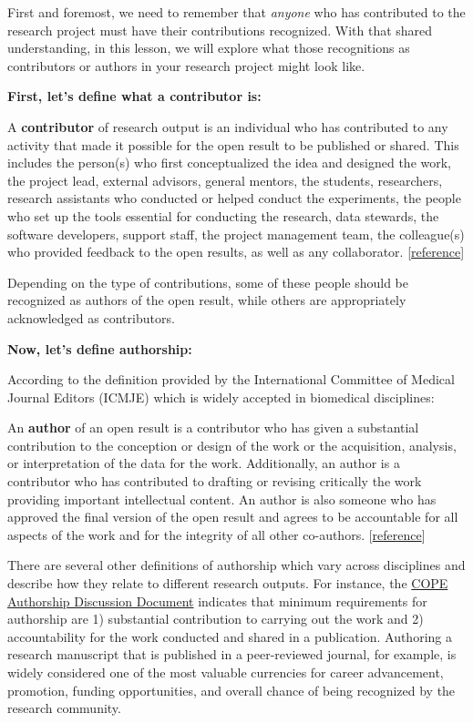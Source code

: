 \documentclass[
  letterpaper,
  DIV=11,
  numbers=noendperiod]{scrreport}
\begin{document}
First and foremost, we need to remember that \emph{anyone} who has
contributed to the research project must have their contributions
recognized. With that shared understanding, in this lesson, we will
explore what those recognitions as contributors or authors in your
research project might look like.

\textbf{First, let's define what a contributor is:}

A \textbf{contributor} of research output is an individual who has
contributed to any activity that made it possible for the open result to
be published or shared. This includes the person(s) who first
conceptualized the idea and designed the work, the project lead,
external advisors, general mentors, the students, researchers, research
assistants who conducted or helped conduct the experiments, the people
who set up the tools essential for conducting the research, data
stewards, the software developers, support staff, the project management
team, the colleague(s) who provided feedback to the open results, as
well as any collaborator.
{[}\href{https://the-turing-way.netlify.app/collaboration/shared-ownership/shared-ownership-projects.html}{reference}{]}

Depending on the type of contributions, some of these people should be
recognized as authors of the open result, while others are appropriately
acknowledged as contributors.

\textbf{Now, let's define authorship:}

According to the definition provided by the International Committee of
Medical Journal Editors (ICMJE) which is widely accepted in biomedical
disciplines:

An \textbf{author} of an open result is a contributor who has given a
substantial contribution to the conception or design of the work or the
acquisition, analysis, or interpretation of the data for the work.
Additionally, an author is a contributor who has contributed to drafting
or revising critically the work providing important intellectual
content. An author is also someone who has approved the final version of
the open result and agrees to be accountable for all aspects of the work
and for the integrity of all other co-authors.
{[}\href{https://www.icmje.org/recommendations/browse/roles-and-responsibilities/defining-the-role-of-authors-and-contributors.html}{reference}{]}

There are several other definitions of authorship which vary across
disciplines and describe how they relate to different research outputs.
For instance, the
\href{https://publicationethics.org/files/COPE_DD_A4_Authorship_SEPT19_SCREEN_AW.pdf}{COPE
Authorship Discussion Document} indicates that minimum requirements for
authorship are 1) substantial contribution to carrying out the work and
2) accountability for the work conducted and shared in a publication.
Authoring a research manuscript that is published in a peer-reviewed
journal, for example, is widely considered one of the most valuable
currencies for career advancement, promotion, funding opportunities, and
overall chance of being recognized by the research community.
\end{document}
